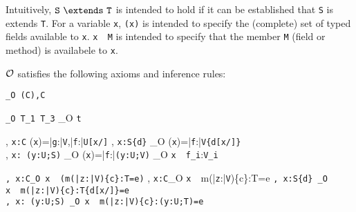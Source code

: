 Intuitively, ${\tt S}\ \extends\ {\tt T}$ is intended to hold if it
can be established that {\tt S} is extends {\tt T}. For a
variable {\tt x}, {\tt \fields({\tt x})} is intended to specify the
(complete) set of typed fields available to {\tt x}. 
{\tt x\ \has\ M} is intended to specify that the member {\tt M}
(field or method) is availabele to {\tt x}.


$\cal O$ satisfies the following axioms and inference rules:
{\footnotesize
{}
{\tt \vdash_{\cal O} \klass({\tt C}),{\tt C} }

{\tt \Gamma \vdash_{\cal O} T_1 \subtype T_3}
{\Gamma \vdash_{\cal O} {\tt t} }

{\Gamma, {\tt x:C} \vdash \fields({\tt x})=\bar{\tt g}:\bar{\tt V},\bar{\tt f}:\bar{\tt U[x/\this]}}
{\Gamma, {\tt x:S\{d\}} \vdash_{\cal O} \fields({\tt x})=\bar{\tt f}:\bar{\tt V\{d[x/\self]\}} \\
 \Gamma, {\tt x: (y:U;S)} \vdash_{\cal O} \fields({\tt x})=\bar{\tt f}:\bar{\tt (y:U;V)}
}
{\Gamma \vdash_{\cal O} {\tt x}\ \has\ {\tt f_i}:{\tt V_i}}


{\tt\Gamma, {\tt x:C}\vdash_{\cal O} {\tt x}\ \has\ (m(\bar{\tt z}:\bar{\tt V\theta})\{c\theta\}:T\theta=e)}
{\Gamma, {\tt x:C}\vdash_{\cal O} {\tt x}\ \has\ m(\bar{\tt z}:\bar{\tt V})\{c\}:T=e}
{\tt\Gamma, x:S\{d\} \vdash_{\cal O} x\ \has\ m(\bar{\tt z}:\bar{\tt V})\{c\}:T\{d[x/\self]\}=e \\
 \tt\Gamma, x: (y:U;S) \vdash_{\cal O} x\ \has\ m(\bar{\tt z}:\bar{\tt V})\{c\}:(y:U;T)=e}
}%

